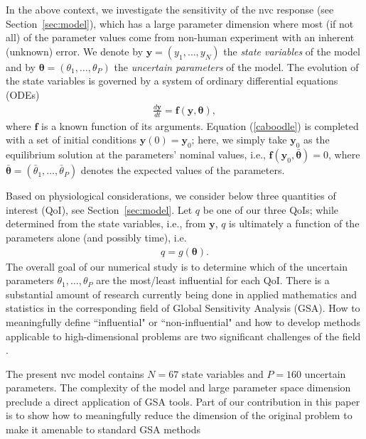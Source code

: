 In the above context, we investigate the sensitivity of  the \gls{nvc} response (see Section~\ref{sec:model}), which has a large parameter dimension where most (if not all) of the parameter values come from non-human experiment  with an inherent (unknown) error. We denote by $\mathbf y = (y_1, \dots, y_N)$  the {\sl state variables} of the model and by $\boldsymbol{\theta} = (\theta_1, \dots, \theta_P)$ the {\sl uncertain parameters} of the model. The evolution of the state variables is governed by a system of ordinary differential equations (ODEs) 
\begin{eqnarray}
\frac {d\boldsymbol{y}}{dt} = \mathbf{f}(\mathbf{y}, \boldsymbol{\theta}), \label{caboodle}
\end{eqnarray}
where $\mathbf{f}$ is a known function of its arguments. Equation (\ref{caboodle}) is completed with a set of initial conditions $\boldsymbol{y}(0) = \boldsymbol{y}_0$;  here, we simply take $\boldsymbol{y}_0$ as the  equilibrium solution at the parameters' nominal values, i.e., $\mathbf f(  \mathbf{y}_0, \bar{\boldsymbol{\theta}}) = 0$, where $ \bar{\boldsymbol{\theta}} = (\bar\theta_1, \dots, \bar\theta_P)$ denotes the expected values of the parameters.

Based on physiological considerations, we consider below three quantities of interest (QoI), see Section~\ref{sec:model}.  Let $q$ be one of our three  QoIs; while determined from the state variables, i.e., from $\mathbf y$, $q$ is  ultimately a function of the parameters alone (and possibly time), i.e.
\begin{eqnarray}
q = g(\boldsymbol{\theta}). \label{qoi}
\end{eqnarray}
The overall goal of our numerical study is to determine  which of the uncertain parameters $\theta_1, \dots, \theta_P$  are the most/least influential for each QoI. There is a substantial amount of research currently being done in applied mathematics and statistics in the corresponding field of Global Sensitivity Analysis  (GSA). How to meaningfully define ``influential" or ``non-influential" and  how to develop methods applicable to high-dimensional problems are two significant challenges of the field \cite{corvar,timegsa,stogsa,iooss,owen,saltelli}. 



The present \gls{nvc} model contains $N=67$ state variables and $P= 160$ uncertain parameters.
The complexity of the model and large parameter space dimension preclude a direct application of GSA tools. Part of our contribution in this paper is to show how to meaningfully reduce the dimension of the original problem to make it amenable to standard GSA methods

